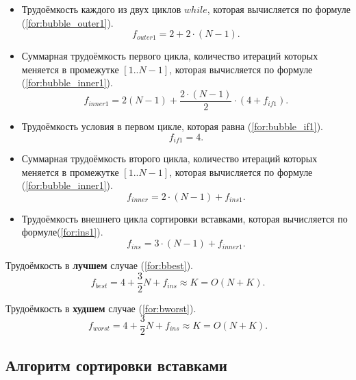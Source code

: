 \begin{itemize}
	\item Трудоёмкость каждого из двух циклов $while$, которая вычисляется по формуле (\ref{for:bubble_outer1}).
	\begin{equation}
		\label{for:bubble_outer1}
		f_{outer1} = 2 + 2 \cdot (N - 1).
	\end{equation}
	\item Суммарная трудоёмкость первого цикла, количество итераций которых меняется в промежутке $[1..N-1]$, которая вычисляется по формуле (\ref{for:bubble_inner1}).
	\begin{equation}
		\label{for:bubble_inner1}
		f_{inner1} = 2(N - 1) + \frac{2 \cdot (N - 1)}{2} \cdot (4 + f_{if1}).
	\end{equation}
	\item Трудоёмкость условия в первом цикле, которая равна (\ref{for:bubble_if1}).
	\begin{equation}
		\label{for:bubble_if1}
		f_{if1} = 4.
	\end{equation}
	\item Суммарная трудоёмкость второго цикла, количество итераций которых меняется в промежутке $[1..N-1]$, которая вычисляется по формуле (\ref{for:bubble_inner1}).
	\begin{equation}
		\label{for:bubble_inner1}
		f_{inner} = 2 \cdot (N - 1) + f_{ins1}.
	\end{equation}
	\item Трудоёмкость внешнего цикла сортировки вставками, которая вычисляется по формуле(\ref{for:ins1}).
	\begin{equation}
		\label{for:ins1}
		f_{ins} = 3 \cdot (N - 1) + f_{inner1}.
	\end{equation}
\end{itemize}

Трудоёмкость в \textbf{лучшем} случае (\ref{for:bbest}).
\begin{equation}
	\label{for:bbest}
	f_{best} = 4 + \frac{3}{2} N + f_{ins} \approx K= O(N + K).
\end{equation}

Трудоёмкость в \textbf{худшем} случае (\ref{for:bworst}).
\begin{equation}
	\label{for:bworst}
	f_{worst} = 4 + \frac{3}{2} N + f_{ins} \approx K= O(N + K).
\end{equation}


\subsection{Алгоритм сортировки вставками}

